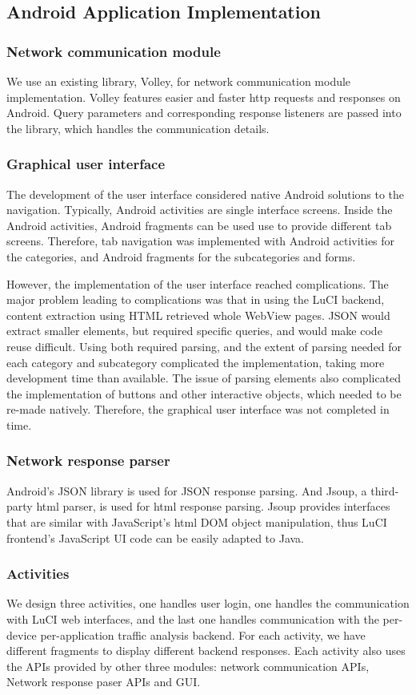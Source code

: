 \subsection{Android Application Implementation}
\subsubsection{Network communication module}
We use an existing library, Volley, for network communication module implementation. Volley features easier and faster http requests and responses on Android. Query parameters and corresponding response listeners are passed into the library, which handles the communication details.

\subsubsection{Graphical user interface}
The development of the user interface considered native Android solutions to the navigation. Typically, Android activities are single interface screens. Inside the Android activities, Android fragments can be used use to provide different tab screens. Therefore, tab navigation was implemented with Android activities for the categories, and Android fragments for the subcategories and forms.

However, the implementation of the user interface reached complications. The major problem leading to complications was that in using the LuCI backend, content extraction using HTML retrieved whole WebView pages. JSON would extract smaller elements, but required specific queries, and would make code reuse difficult. Using both required parsing, and the extent of parsing needed for each category and subcategory complicated the implementation, taking more development time than available. The issue of parsing elements also complicated the implementation of buttons and other interactive objects, which needed to be re-made natively. Therefore, the graphical user interface was not completed in time.

\subsubsection{Network response parser}

Android's JSON library is used for JSON response parsing. And Jsoup, a third-party html parser, is used for html response parsing. Jsoup provides interfaces that are similar with JavaScript's html DOM object manipulation, thus LuCI frontend's JavaScript UI code can be easily adapted to Java.

\subsubsection{Activities}
We design three activities, one handles user login, one handles the communication with LuCI web interfaces, and the last one handles communication with the per-device per-application traffic analysis backend. For each activity, we have different fragments to display different backend responses. Each activity also uses the APIs provided by other three modules: network communication APIs, Network response paser APIs and GUI.
